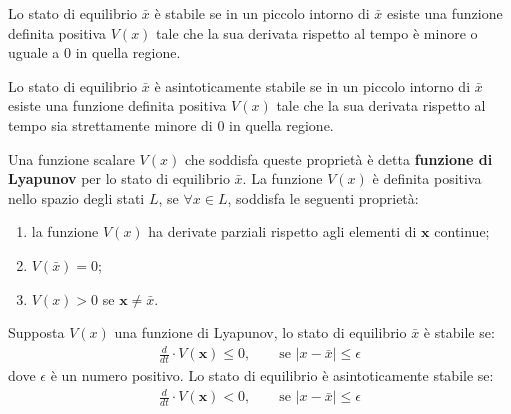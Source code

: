 \begin{thm}
    Lo stato di equilibrio $\bar{x}$ è stabile se in un piccolo intorno di $\bar{x}$ esiste una funzione definita positiva $V(x)$ tale che la sua derivata rispetto al tempo è minore o uguale a 0 in quella regione.
\end{thm}

\begin{thm}
     Lo stato di equilibrio $\bar{x}$ è asintoticamente stabile se in un piccolo intorno di $\bar{x}$ esiste una funzione definita positiva $V(x)$ tale che la sua derivata rispetto al tempo sia strettamente minore di 0 in quella regione.
\end{thm}

Una funzione scalare $V(x)$ che soddisfa queste proprietà è detta \textbf{funzione di Lyapunov} per lo stato di equilibrio $\bar{x}$.
La funzione $V(x)$ è definita positiva nello spazio degli stati $L$, se $\forall x \in L$, soddisfa le seguenti proprietà:
\begin{enumerate}
    \item la funzione $V(x)$ ha derivate parziali rispetto agli elementi di $\mathbf{x}$ continue;
    \item $V(\bar{x})=0$;
    \item $V(x)>0$ se $\mathbf{x} \neq \bar{x}$.
\end{enumerate}

Supposta $V(x)$ una funzione di Lyapunov, lo stato di equilibrio $\bar{x}$ è stabile se:
\begin{align*}
    \frac{d}{dt} \cdot V(\mathbf{x}) \leq 0, \qquad \text{se } \left|x - \bar{x} \right| \leq \epsilon
\end{align*}
dove $\epsilon$ è un numero positivo. Lo stato di equilibrio è asintoticamente stabile se:
\begin{align*}
    \frac{d}{dt} \cdot V(\mathbf{x}) < 0, \qquad \text{se } \left|x - \bar{x} \right| \leq \epsilon
\end{align*}

